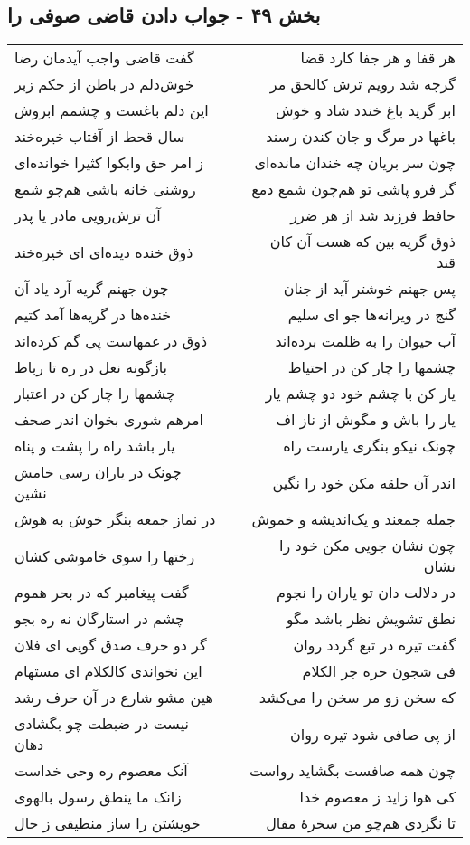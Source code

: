 \begin{center}
\section*{بخش ۴۹ - جواب دادن قاضی صوفی را}
\label{sec:sh049}
\begin{longtable}{l p{0.5cm} r}
گفت قاضی واجب آیدمان رضا
&&
هر قفا و هر جفا کارد قضا
\\
خوش‌دلم در باطن از حکم زبر
&&
گرچه شد رویم ترش کالحق مر
\\
این دلم باغست و چشمم ابروش
&&
ابر گرید باغ خندد شاد و خوش
\\
سال قحط از آفتاب خیره‌خند
&&
باغها در مرگ و جان کندن رسند
\\
ز امر حق وابکوا کثیرا خوانده‌ای
&&
چون سر بریان چه خندان مانده‌ای
\\
روشنی خانه باشی هم‌چو شمع
&&
گر فرو پاشی تو هم‌چون شمع دمع
\\
آن ترش‌رویی مادر یا پدر
&&
حافظ فرزند شد از هر ضرر
\\
ذوق خنده دیده‌ای ای خیره‌خند
&&
ذوق گریه بین که هست آن کان قند
\\
چون جهنم گریه آرد یاد آن
&&
پس جهنم خوشتر آید از جنان
\\
خنده‌ها در گریه‌ها آمد کتیم
&&
گنج در ویرانه‌ها جو ای سلیم
\\
ذوق در غمهاست پی گم کرده‌اند
&&
آب حیوان را به ظلمت برده‌اند
\\
بازگونه نعل در ره تا رباط
&&
چشمها را چار کن در احتیاط
\\
چشمها را چار کن در اعتبار
&&
یار کن با چشم خود دو چشم یار
\\
امرهم شوری بخوان اندر صحف
&&
یار را باش و مگوش از ناز اف
\\
یار باشد راه را پشت و پناه
&&
چونک نیکو بنگری یارست راه
\\
چونک در یاران رسی خامش نشین
&&
اندر آن حلقه مکن خود را نگین
\\
در نماز جمعه بنگر خوش به هوش
&&
جمله جمعند و یک‌اندیشه و خموش
\\
رختها را سوی خاموشی کشان
&&
چون نشان جویی مکن خود را نشان
\\
گفت پیغامبر که در بحر هموم
&&
در دلالت دان تو یاران را نجوم
\\
چشم در استارگان نه ره بجو
&&
نطق تشویش نظر باشد مگو
\\
گر دو حرف صدق گویی ای فلان
&&
گفت تیره در تبع گردد روان
\\
این نخواندی کالکلام ای مستهام
&&
فی شجون حره جر الکلام
\\
هین مشو شارع در آن حرف رشد
&&
که سخن زو مر سخن را می‌کشد
\\
نیست در ضبطت چو بگشادی دهان
&&
از پی صافی شود تیره روان
\\
آنک معصوم ره وحی خداست
&&
چون همه صافست بگشاید رواست
\\
زانک ما ینطق رسول بالهوی
&&
کی هوا زاید ز معصوم خدا
\\
خویشتن را ساز منطیقی ز حال
&&
تا نگردی هم‌چو من سخرهٔ مقال
\\
\end{longtable}
\end{center}

